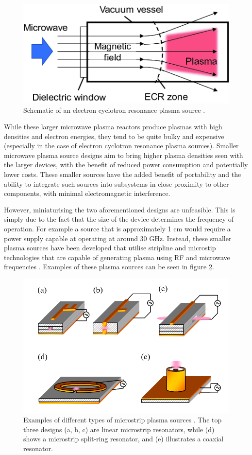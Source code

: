 \begin{figure}[h!]
	\centering
	\includegraphics[width=0.65\linewidth]{chapter_2/figures/electron_cyclotron_resonance.png}
	\caption{Schematic of an electron cyclotron resonance plasma source \cite{Toyoda2020}.}
	\label{fig:electron_cyclotron_resonance}
\end{figure} 

While these larger microwave plasma reactors produce plasmas with high densities and electron energies, they tend to be quite bulky and expensive (especially in the case of electron cyclotron resonance plasma sources). Smaller microwave plasma source designs aim to bring higher plasma densities seen with the larger devices, with the benefit of reduced power consumption and potentially lower costs. These smaller sources have the added benefit of portability and the ability to integrate such sources into subsystems in close proximity to other components, with minimal electromagnetic interference.

However, miniaturising the two aforementioned designs are unfeasible. This is simply due to the fact that the size of the device determines the frequency of operation. For example a source that is approximately 1 cm would require a power supply capable at operating at around 30 GHz. Instead, these smaller plasma sources have been developed that utilise stripline and microstip technologies that are capable of generating plasma using RF and microwave frequencies \cite{Pollak2007, Iza2003}. Examples of these plasma sources can be seen in figure \ref{fig:microstrip_microwave_discharge}. 

\begin{figure}[h!]
	\centering
	\includegraphics[width=0.9\linewidth]{chapter_2/figures/microstrip_microwave_discharge.png}
	\caption{Examples of different types of microstrip plasma sources \cite{Iza2008}. The top three designs (a, b, c) are linear microstrip resonators, while (d) shows a microstrip split-ring resonator, and (e) illustrates a coaxial resonator.}
	\label{fig:microstrip_microwave_discharge}
\end{figure} 

